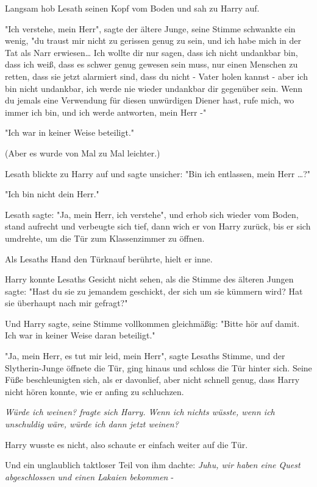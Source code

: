 {Langsam hob Lesath seinen Kopf vom Boden und sah zu Harry auf.

"Ich verstehe, mein Herr", sagte der ältere Junge, seine Stimme schwankte ein wenig, "du traust mir nicht zu gerissen genug zu sein, und ich habe mich in der Tat als Narr erwiesen… Ich wollte dir nur sagen, dass ich nicht undankbar bin, dass ich weiß, dass es schwer genug gewesen sein muss, nur einen Menschen zu retten, dass sie jetzt alarmiert sind, dass du nicht - Vater holen kannst - aber ich bin nicht undankbar, ich werde nie wieder undankbar dir gegenüber sein. Wenn du jemals eine Verwendung für diesen unwürdigen Diener hast, rufe mich, wo immer ich bin, und ich werde antworten, mein Herr -"

"Ich war in keiner Weise beteiligt."

(Aber es wurde von Mal zu Mal leichter.)

Lesath blickte zu Harry auf und sagte unsicher: "Bin ich entlassen, mein Herr …?"

"Ich bin nicht dein Herr."

Lesath sagte: "Ja, mein Herr, ich verstehe", und erhob sich wieder vom Boden, stand aufrecht und verbeugte sich tief, dann wich er von Harry zurück, bis er sich umdrehte, um die Tür zum Klassenzimmer zu öffnen.

Als Lesaths Hand den Türknauf berührte, hielt er inne.

Harry konnte Lesaths Gesicht nicht sehen, als die Stimme des älteren Jungen sagte: "Hast du sie zu jemandem geschickt, der sich um sie kümmern wird? Hat sie überhaupt nach mir gefragt?"

Und Harry sagte, seine Stimme vollkommen gleichmäßig: "Bitte hör auf damit. Ich war in keiner Weise daran beteiligt."

"Ja, mein Herr, es tut mir leid, mein Herr", sagte Lesaths Stimme, und der Slytherin-Junge öffnete die Tür, ging hinaus und schloss die Tür hinter sich. Seine Füße beschleunigten sich, als er davonlief, aber nicht schnell genug, dass Harry nicht hören konnte, wie er anfing zu schluchzen.

\emph{\emph{Würde ich weinen?} fragte sich Harry. \emph{Wenn ich nichts wüsste, wenn ich unschuldig wäre, würde ich dann jetzt weinen?}}

Harry wusste es nicht, also schaute er einfach weiter auf die Tür.

Und ein unglaublich taktloser Teil von ihm dachte: \emph{Juhu, wir haben eine Quest abgeschlossen und einen Lakaien bekommen} -

}
